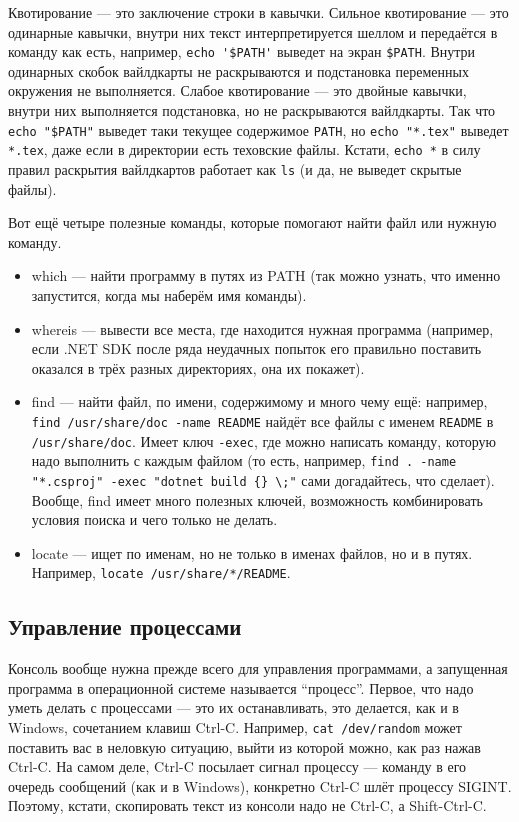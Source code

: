 \documentclass{../../text-style}
\begin{document}
Квотирование --- это заключение строки в кавычки.
Сильное квотирование --- это одинарные кавычки, внутри них текст интерпретируется шеллом и передаётся в команду как есть, например, \verb|echo '$PATH'| выведет на экран \verb|$PATH|.
Внутри одинарных скобок вайлдкарты не раскрываются и подстановка переменных окружения не выполняется.
Слабое квотирование --- это двойные кавычки, внутри них выполняется подстановка, но не раскрываются вайлдкарты.
Так что \verb|echo "$PATH"| выведет таки текущее содержимое \verb|PATH|, но \verb|echo "*.tex"| выведет \verb|*.tex|, даже если в директории есть теховские файлы.
Кстати, \verb|echo *| в силу правил раскрытия вайлдкартов работает как \verb|ls| (и да, не выведет скрытые файлы).

Вот ещё четыре полезные команды, которые помогают найти файл или нужную команду.

\begin{itemize}
    \item which --- найти программу в путях из PATH (так можно узнать, что именно запустится, когда мы наберём имя команды).
    \item whereis --- вывести все места, где находится нужная программа (например, если .NET SDK после ряда неудачных попыток его правильно поставить оказался в трёх разных директориях, она их покажет).
    \item find --- найти файл, по имени, содержимому и много чему ещё: например, \verb|find /usr/share/doc -name README| найдёт все файлы с именем \verb|README| в \verb|/usr/share/doc|. 
        Имеет ключ \verb|-exec|, где можно написать команду, которую надо выполнить с каждым файлом (то есть, например, \verb|find . -name "*.csproj" -exec "dotnet build {} \;"| сами догадайтесь, что сделает).
        Вообще, find имеет много полезных ключей, возможность комбинировать условия поиска и чего только не делать.
    \item locate --- ищет по именам, но не только в именах файлов, но и в путях.
        Например, \verb|locate /usr/share/*/README|.
\end{itemize}

\subsection{Управление процессами}

Консоль вообще нужна прежде всего для управления программами, а запущенная программа в операционной системе называется \enquote{процесс}. 
Первое, что надо уметь делать с процессами --- это их останавливать, это делается, как и в Windows, сочетанием клавиш Ctrl-C.
Например, \verb|cat /dev/random| может поставить вас в неловкую ситуацию, выйти из которой можно, как раз нажав Ctrl-C.
На самом деле, Ctrl-C посылает сигнал процессу --- команду в его очередь сообщений (как и в Windows), конкретно Ctrl-C шлёт процессу SIGINT.
Поэтому, кстати, скопировать текст из консоли надо не Ctrl-C, а Shift-Ctrl-C.
\end{document}

